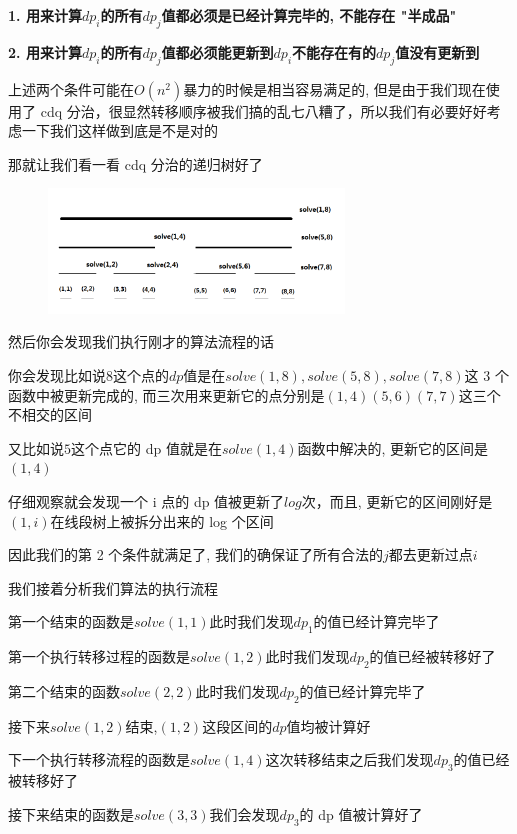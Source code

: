 \textbf{1. 用来计算$dp_{i}$的所有$dp_{j}$值都必须是已经计算完毕的, 不能存在 "半成品"}

\textbf{2. 用来计算$dp_{i}$的所有$dp_{j}$值都必须能更新到$dp_{i}$不能存在有的$dp_{j}$值没有更新到}

上述两个条件可能在$O(n^2)$暴力的时候是相当容易满足的, 但是由于我们现在使用了 cdq 分治，很显然转移顺序被我们搞的乱七八糟了，所以我们有必要好好考虑一下我们这样做到底是不是对的

那就让我们看一看 cdq 分治的递归树好了

\begin{figure}[htbp]
\centering
\includegraphics[width=0.7\textwidth]{docs/misc/images/cdq1.png} 

\end{figure}

然后你会发现我们执行刚才的算法流程的话

你会发现比如说$8$这个点的$dp$值是在$solve(1,8),solve(5,8),solve(7,8)$这 3 个函数中被更新完成的, 而三次用来更新它的点分别是$(1,4)(5,6)(7,7)$这三个不相交的区间

又比如说$5$这个点它的 dp 值就是在$solve(1,4)$函数中解决的, 更新它的区间是$(1,4)$

仔细观察就会发现一个 i 点的 dp 值被更新了$log$次，而且, 更新它的区间刚好是$(1,i)$在线段树上被拆分出来的 log 个区间

因此我们的第 2 个条件就满足了, 我们的确保证了所有合法的$j$都去更新过点$i$

我们接着分析我们算法的执行流程

第一个结束的函数是$solve(1,1)$此时我们发现$dp_{1}$的值已经计算完毕了

第一个执行转移过程的函数是$solve(1,2)$此时我们发现$dp_{2}$的值已经被转移好了

第二个结束的函数$solve(2,2)$此时我们发现$dp_{2}$的值已经计算完毕了

接下来$solve(1,2)$结束,$(1,2)$这段区间的$dp$值均被计算好

下一个执行转移流程的函数是$solve(1,4)$这次转移结束之后我们发现$dp_{3}$的值已经被转移好了

接下来结束的函数是$solve(3,3)$我们会发现$dp_{3}$的 dp 值被计算好了

